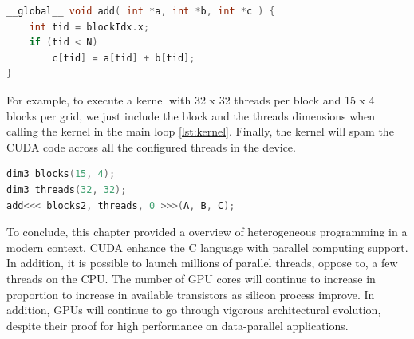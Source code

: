 \begin{lstlisting}[language=C++, label={lst:gpu}, caption={GPU Kernel threads launch}]
__global__ void add( int *a, int *b, int *c ) {
	int tid = blockIdx.x;
	if (tid < N)
		c[tid] = a[tid] + b[tid];
}
\end{lstlisting}

For example, to execute a kernel with 32 x 32 threads per block and 15 x 4 blocks per grid, we just include the block and the threads dimensions when calling the kernel in the main loop \ref{lst:kernel}. Finally, the kernel will spam the CUDA code across all the configured threads in the device.

\begin{lstlisting}[language=C++, label={lst:kernel}, caption={Kernel call with configurable threads per block and block per grid}]
dim3 blocks(15, 4);
dim3 threads(32, 32);
add<<< blocks2, threads, 0 >>>(A, B, C);
\end{lstlisting}


\vspace{4.0em}


To conclude, this chapter provided a overview of heterogeneous programming in a modern context. CUDA enhance the C language with parallel computing support. In addition, it is possible to launch millions of parallel threads, oppose to, a few threads on the CPU. The number of GPU cores will continue to increase in proportion to increase in available transistors as silicon process improve. In addition, GPUs will continue to go through vigorous architectural evolution, despite their proof for high performance on data-parallel applications.







